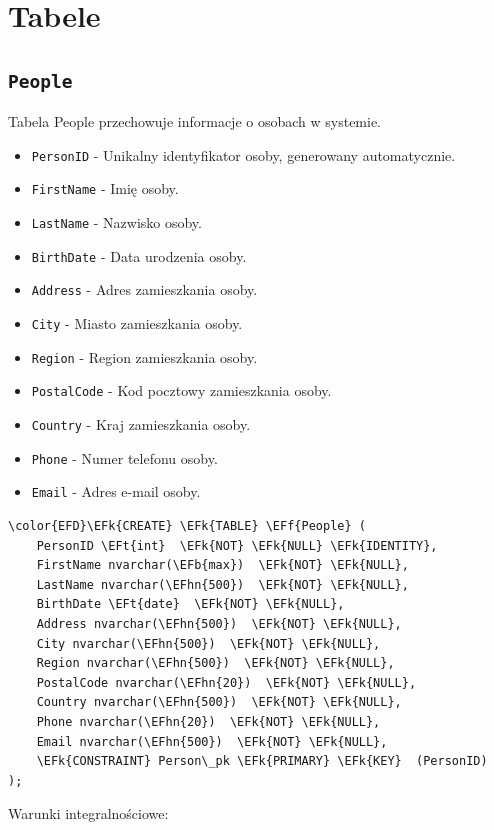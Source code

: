 \documentclass[11pt]{article}
\newcommand{\EFk}[1]{\textcolor{EFk}{\textbf{#1}}} %
\newcommand{\EFb}[1]{\textcolor{EFb}{\textbf{#1}}} %
\newcommand{\EFf}[1]{\textcolor{EFf}{#1}} %
\newcommand{\EFt}[1]{\textcolor{EFt}{\textbf{#1}}} %
\newcommand{\EFhn}[1]{\textcolor{EFhn}{#1}} %
\begin{document}
\newpage
\section{Tabele}
\label{sec:orge22b84c}
\subsection{\texttt{People}}
\label{sec:org2475a43}
Tabela People przechowuje informacje o osobach w systemie.
\begin{itemize}
\item \texttt{PersonID} - Unikalny identyfikator osoby, generowany automatycznie.
\item \texttt{FirstName} - Imię osoby.
\item \texttt{LastName} - Nazwisko osoby.
\item \texttt{BirthDate} - Data urodzenia osoby.
\item \texttt{Address} - Adres zamieszkania osoby.
\item \texttt{City} - Miasto zamieszkania osoby.
\item \texttt{Region} - Region zamieszkania osoby.
\item \texttt{PostalCode} - Kod pocztowy zamieszkania osoby.
\item \texttt{Country} - Kraj zamieszkania osoby.
\item \texttt{Phone} - Numer telefonu osoby.
\item \texttt{Email} - Adres e-mail osoby.
\end{itemize}
\begin{Code}
\begin{Verbatim}
\color{EFD}\EFk{CREATE} \EFk{TABLE} \EFf{People} (
    PersonID \EFt{int}  \EFk{NOT} \EFk{NULL} \EFk{IDENTITY},
    FirstName nvarchar(\EFb{max})  \EFk{NOT} \EFk{NULL},
    LastName nvarchar(\EFhn{500})  \EFk{NOT} \EFk{NULL},
    BirthDate \EFt{date}  \EFk{NOT} \EFk{NULL},
    Address nvarchar(\EFhn{500})  \EFk{NOT} \EFk{NULL},
    City nvarchar(\EFhn{500})  \EFk{NOT} \EFk{NULL},
    Region nvarchar(\EFhn{500})  \EFk{NOT} \EFk{NULL},
    PostalCode nvarchar(\EFhn{20})  \EFk{NOT} \EFk{NULL},
    Country nvarchar(\EFhn{500})  \EFk{NOT} \EFk{NULL},
    Phone nvarchar(\EFhn{20})  \EFk{NOT} \EFk{NULL},
    Email nvarchar(\EFhn{500})  \EFk{NOT} \EFk{NULL},
    \EFk{CONSTRAINT} Person\_pk \EFk{PRIMARY} \EFk{KEY}  (PersonID)
);
\end{Verbatim}
\end{Code}
Warunki integralnościowe:
\end{document}
